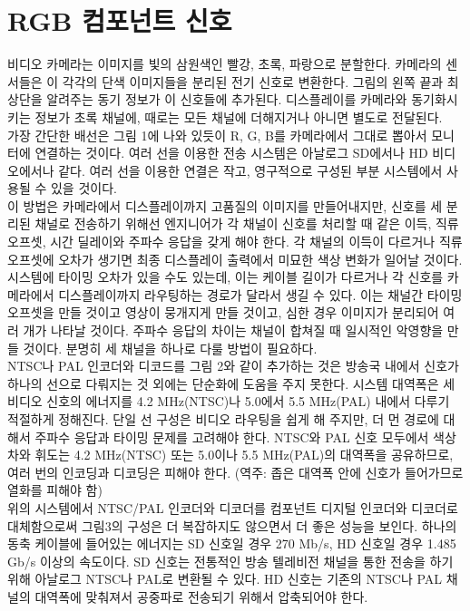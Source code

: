 \section{RGB 컴포넌트 신호}
비디오 카메라는 이미지를 빛의 삼원색인 빨강, 초록, 파랑으로 분할한다. 카메라의 센서들은 이 각각의 단색 이미지들을 분리된 전기 신호로 변환한다.
그림의 왼쪽 끝과 최상단을 알려주는 동기 정보가 이 신호들에 추가된다. 디스플레이를 카메라와 동기화시키는 정보가 초록 채널에, 때로는 모든 채널에 더해지거나 아니면 별도로 전달된다.
\\
가장 간단한 배선은 {그림 1}에 나와 있듯이 R, G, B를 카메라에서 그대로 뽑아서 모니터에 연결하는 것이다. 여러 선을 이용한 전송 시스템은 아날로그 SD에서나 HD 비디오에서나 같다.
여러 선을 이용한 연결은 작고, 영구적으로 구성된 부분 시스템에서 사용될 수 있을 것이다.
\\
이 방법은 카메라에서 디스플레이까지 고품질의 이미지를 만들어내지만, 신호를 세 분리된 채널로 전송하기 위해선 엔지니어가 각 채널이 신호를 처리할 때 같은 이득, 직류 오프셋, 시간 딜레이와 주파수 응답을 갖게 해야 한다.
각 채널의 이득이 다르거나 직류 오프셋에 오차가 생기면 최종 디스플레이 출력에서 미묘한 색상 변화가 일어날 것이다.
시스템에 타이밍 오차가 있을 수도 있는데, 이는 케이블 길이가 다르거나 각 신호를 카메라에서 디스플레이까지 라우팅하는 경로가 달라서 생길 수 있다.
이는 채널간 타이밍 오프셋을 만들 것이고 영상이 뭉개지게 만들 것이고, 심한 경우 이미지가 분리되어 여러 개가 나타날 것이다.
주파수 응답의 차이는 채널이 합쳐질 때 일시적인 악영향을 만들 것이다.
분명히 세 채널을 하나로 다룰 방법이 필요하다.
\\
NTSC나 PAL 인코더와 디코드를 {그림 2}와 같이 추가하는 것은 방송국 내에서 신호가 하나의 선으로 다뤄지는 것 외에는 단순화에 도움을 주지 못한다.
시스템 대역폭은 세 비디오 신호의 에너지를 4.2 MHz(NTSC)나 5.0에서 5.5 MHz(PAL) 내에서 다루기 적절하게 정해진다.
단일 선 구성은 비디오 라우팅을 쉽게 해 주지만, 더 먼 경로에 대해서 주파수 응답과 타이밍 문제를 고려해야 한다.
NTSC와 PAL 신호 모두에서 색상차와 휘도는 4.2 MHz(NTSC) 또는 5.0이나 5.5 MHz(PAL)의 대역폭을 공유하므로, 여러 번의 인코딩과 디코딩은 피해야 한다.
(역주: 좁은 대역폭 안에 신호가 들어가므로 열화를 피해야 함)
\\
위의 시스템에서 NTSC/PAL 인코더와 디코더를 컴포넌트 디지털 인코더와 디코더로 대체함으로써 {그림3}의 구성은 더 복잡하지도 않으면서 더 좋은 성능을 보인다.
하나의 동축 케이블에 들어있는 에너지는 SD 신호일 경우 270 Mb/s, HD 신호일 경우 1.485 Gb/s 이상의 속도이다.
SD 신호는 전통적인 방송 텔레비전 채널을 통한 전송을 하기 위해 아날로그 NTSC나 PAL로 변환될 수 있다.
HD 신호는 기존의 NTSC나 PAL 채널의 대역폭에 맞춰져서 공중파로 전송되기 위해서 압축되어야 한다.

